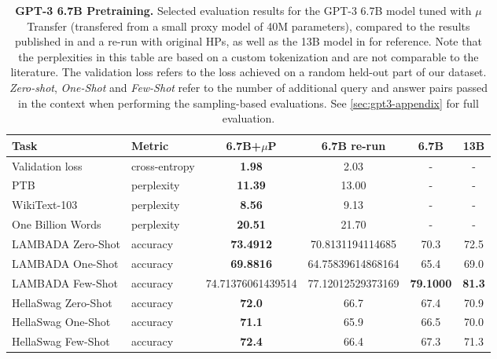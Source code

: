 \documentclass{article}
\theoremstyle{definition}
\begin{document}
\begin{table}[]
    \centering
    \caption[$\mu$Transfer results for GPT-3 pretraining]{\textbf{GPT-3 6.7B Pretraining.} Selected evaluation results for the GPT-3 6.7B model tuned with $\mu$Transfer (transfered from a small proxy model of 40M parameters), compared to the results published in \cite{brown2020language} and a re-run with original HPs, as well as the 13B model in \cite{brown2020language} for reference.
    Note that the perplexities in this table are based on a custom tokenization and are not comparable to the literature. The validation loss refers to the loss achieved on a random held-out part of our dataset. \emph{Zero-shot}, \emph{One-Shot} and \emph{Few-Shot} refer to the number of additional query and answer pairs passed in the context when performing the sampling-based evaluations.
    See \cref{sec:gpt3-appendix} for full evaluation.}
    \begin{tabular}{llSSSS}
    \toprule
        Task & Metric & {6.7B+$\mu$P} & {6.7B re-run} & {6.7B \cite{brown2020language}} & {13B \cite{brown2020language}} \\
    \midrule
        Validation loss & cross-entropy & \bfseries 1.98 & 2.03 & {-} & {-} \\
        PTB & perplexity & \bfseries 11.39 & 13.00 & {-} & {-} \\
        WikiText-103 & perplexity & \bfseries 8.56 & 9.13 & {-} & {-} \\
        One Billion Words & perplexity & \bfseries 20.51 & 21.70 & {-} & {-} \\
        LAMBADA Zero-Shot & accuracy & \bfseries 73.4912 & 70.8131194114685 &  70.3 & 72.5 \\
        LAMBADA One-Shot & accuracy & \bfseries 69.8816 & 64.75839614868164 & 65.4 & 69.0 \\
        LAMBADA Few-Shot & accuracy & 74.71376061439514 & 77.12012529373169 & \bfseries 79.1000  & \bfseries 81.3\\
        HellaSwag Zero-Shot & accuracy & \bfseries 72.0 & 66.7 & 67.4 & 70.9 \\
        HellaSwag One-Shot & accuracy & \bfseries 71.1 & 65.9 & 66.5 & 70.0 \\
        HellaSwag Few-Shot & accuracy & \bfseries 72.4 & 66.4 & 67.3 & 71.3\\
    \bottomrule
    \end{tabular}
    \label{tab:gpt3-main-evals}
\end{table}
\end{document}
